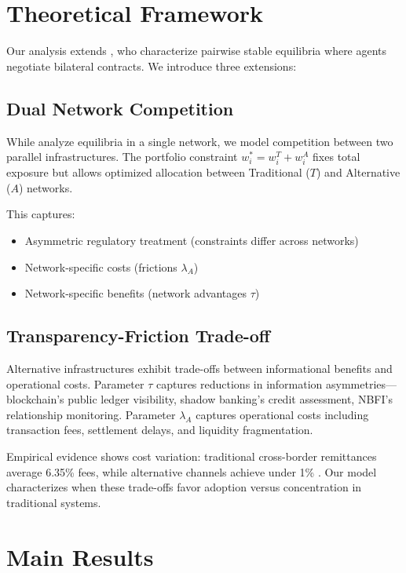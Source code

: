 \section{Theoretical Framework}

Our analysis extends , who characterize pairwise stable equilibria where agents negotiate bilateral contracts. We introduce three extensions:

\subsection{Dual Network Competition}

While  analyze equilibria in a single network, we model competition between two parallel infrastructures. The portfolio constraint $w^*_i = w^T_i + w^A_i$ fixes total exposure but allows optimized allocation between Traditional ($T$) and Alternative ($A$) networks.

This captures:
\begin{itemize}
    \item Asymmetric regulatory treatment (constraints differ across networks)
    \item Network-specific costs (frictions $\lambda_A$)
    \item Network-specific benefits (network advantages $\tau$)
\end{itemize}

\subsection{Transparency-Friction Trade-off}

Alternative infrastructures exhibit trade-offs between informational benefits and operational costs. Parameter $\tau$ captures reductions in information asymmetries—blockchain's public ledger visibility, shadow banking's credit assessment, NBFI's relationship monitoring. Parameter $\lambda_A$ captures operational costs including transaction fees, settlement delays, and liquidity fragmentation.

Empirical evidence shows cost variation: traditional cross-border remittances average 6.35\% fees, while alternative channels achieve under 1\% \cite{world_bank_remittance_2024}. Our model characterizes when these trade-offs favor adoption versus concentration in traditional systems.

\section{Main Results}

